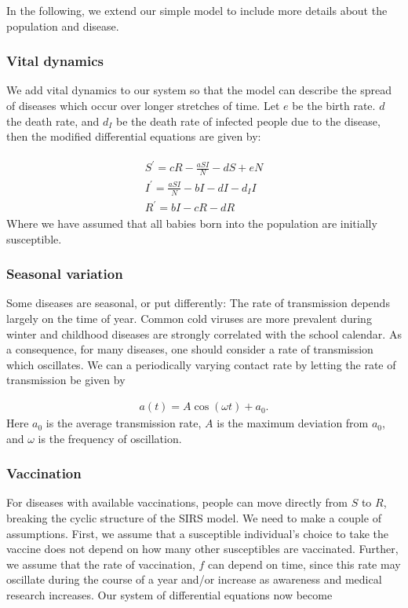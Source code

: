 \documentclass[../main.tex]{subfiles}
\begin{document}
In the following, we extend our simple model to include more details about the population and disease. 

\subsubsection{Vital dynamics}
We add vital dynamics to our system so that the model can describe the spread of diseases which occur over longer stretches of time. Let $e$  be the birth rate. $d$ the death rate, and $d_I$ be the death rate of infected people due to the disease, then the modified differential equations are given by:

\begin{align}
    \begin{split}
        S^{'}=cR-\frac{aSI}{N}-dS+eN \\
        I^{'}=\frac{aSI}{N}-bI-dI-d_II \\
        R^{'}=bI-cR-dR
    \end{split}
\end{align} Where we have assumed that all babies born into the population are initially susceptible. 

\subsubsection{Seasonal variation}
Some diseases are seasonal, or put differently: The rate of transmission depends largely on the time of year. Common cold viruses are more prevalent during winter and childhood diseases are strongly correlated with the school calendar\cite{Greenhalgh2003}.  As a consequence, for many diseases, one should consider a rate of transmission which oscillates. We can a periodically varying contact rate by letting the rate of transmission be given by

\begin{align}\label{eq:a}
    a(t)=A\cos(\omega t)+a_0.
\end{align} Here $a_0$ is the average transmission rate, $A$ is the maximum deviation from $a_0$, and $\omega$ is the frequency of oscillation. 

\subsubsection{Vaccination}
For diseases with available vaccinations, people can move directly from $S$ to $R$, breaking the cyclic structure of the SIRS model. We need to make a couple of assumptions. First, we assume that a susceptible individual's choice to take the vaccine does not depend on how many other susceptibles are vaccinated. Further, we assume that the rate of vaccination, $f$ can depend on time, since this rate may oscillate during the course of a year and/or increase as awareness and medical research increases. Our system of differential equations now become
\end{document}
